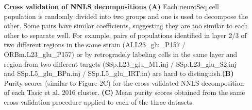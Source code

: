 \textbf{Cross validation of NNLS decompositions}
\textbf{(A)} Each neuroSeq cell population is randomly divided into two groups and one is used to decompose the other. Some pairs have similar coefficients, suggesting they are too similar to each other to separate well. For example, pairs of populations identified in layer 2/3 of two different regions in the same strain (AI.L23_glu_P157 / ORBm.L23_glu_P157) or by retrogradely labeling cells in the same layer and region from two different targets (SSp.L23_glu_M1.inj / SSp.L23_glu_S2.inj and SSp.L5_glu_BPn.inj / SSp.L5_glu_IRT.in) are hard to distinguish.\textbf{(B)} Purity scores (similar to Figure 2C) for the cross-validated NNLS decomposition of each Tasic et al. 2016 cluster. \textbf{(C)} Mean purity scores obtained from the same cross-validation procedure applied to each of the three datasets. 